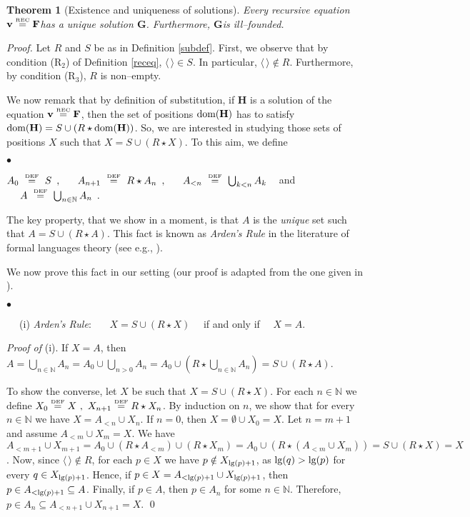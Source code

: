 \documentclass[copyright,creativecommons]{eptcs}
\def\eg{e.g., }
\newcommand{\vv}{\langle}
\newcommand{\ww}{\rangle}
\newcommand{\NN}{\mathbb{N}}
\newcommand{\eqdef}{\stackrel{\text{\tiny \textnormal{DEF}}}{=}}
\newcommand{\eqrec}{\stackrel{\text{\tiny \textnormal{REC}}}{=}}
\newcommand{\roo}{\vv \, \ww}
\newcommand{\bF}{\mathbf{F}}
\newcommand{\bG}{\mathbf{G}}
\newcommand{\bH}{\mathbf{H}}
\newcommand{\bbv}{\mathbf{v}}
\newcommand{\len}{\textnormal{lg}}
\newcommand{\dom}{\ensuremath{\textnormal{dom}}}
\newtheorem{theorem}{Theorem}[section]   \newtheorem{lemma}[theorem]{Lemma}
\theoremstyle{definition}
\newcommand{\squishlist}{
 \begin{list}{$\bullet$}
  { \setlength{\itemsep}{0pt}
     \setlength{\parsep}{3pt}
     \setlength{\topsep}{3pt}
     \setlength{\partopsep}{0pt}
     \setlength{\leftmargin}{1em}
     \setlength{\labelwidth}{1.5em}
     \setlength{\labelsep}{0.5em} } }
\newcommand{\squishend}{
  \end{list}  }
\begin{document}
\begin{theorem}[Existence and uniqueness of solutions] \label{recthem}
Every recursive equation  \/$\bbv \eqrec \bF$\@  has
a unique solution \/$\bG$\@. Furthermore,
\/$\bG$\@ is ill--founded.  \end{theorem}
\begin{proof}
Let $R$ and $S$ be as in Definition \ref{subdef}.
First, we observe that by  condition   (R$_2$)  of Definition \ref{receq}, $\roo \in S$.
In particular, $\roo \notin R$. Furthermore, by condition (R$_3$), $R$ is non--empty.


We now remark that by definition of substitution, if  $\bH$
is a solution
of the equation $\bbv \eqrec \bF$,
then the set of positions $\dom(\bH)$ has to satisfy $\dom(\bH) = S \cup (R \star \dom(\bH))$.
So, we are interested in studying   those sets of positions
$X$
such that  $ X= S \cup (R \star X)$.
To this aim, we define



\squishlist
\item[] {\centering
$ A_0 \ \eqdef \ S \enspace, \ \ \quad A_{n+1} \ \eqdef \  R \star A_n\enspace, \ \ \quad A_{< n} \ \eqdef \ \bigcup_{k < n}A_k  \enspace \  $ and $ \ \quad A \ \eqdef \  \bigcup_{n \in \NN} A_n \enspace.$ \par}
 \squishend


\noindent The key  property, that we show in  a moment, is that $A$ is the \emph{unique} set
 such that $ A= S \cup (R \star A)$.
This fact is known as \emph{Arden's Rule}
in the literature of formal languages
theory (see \eg \cite{manna}).

  We now  prove this fact in our setting (our proof is adapted from the one given in \cite{manna}).



\squishlist
\item[$\phantom{ab}$ (i)] \emph{Arden's Rule}: \ \ \  $ X= S \cup (R \star X)$ \ \  if and only if \ \
$X= A$.
 \squishend
 \noindent\emph{Proof of} (i).
 If  $X = A$, then   $A =  \bigcup_{n \in \NN} A_n = A_0 \cup \bigcup_{n >0}A_n = A_0 \cup (R \star \bigcup_{n \in \NN}A_n) =  S \cup (R \star A)$.


 To show the converse, let $X$ be such that $ X= S \cup (R \star X)$.
 For each $n \in \NN$  we define
$ X_0 \eqdef X \ , \ X_{n+1} \eqdef R \star X_n$.
By induction on $n$, we show  that for every  $n \in \NN$ we have
$X = A_{< n} \cup X_n$.
If $n=0$, then $  X = \emptyset \cup X_0 = X$.
Let  $n = m+1$ and assume $A_{< m} \cup  X_{m} =X$.
We have  $ A_{< m+1}   \cup X_{m+1} =
 A_0 \cup  (R \star  A_{< m})  \cup (R \star X_{m})
 = A_0 \cup (R \star (A_{< m} \cup  X_{m})) = S \cup (R \star X) = X
$.
Now,
since $ \roo \notin R$,  for  each $p \in X$   we have $p \notin X_{\len(p)+1}$, as  $\len(q) > \len(p)$
for every
$ q \in X_{\len(p)+1}$.
Hence, if $p \in  X =  A_{< \len(p)+1} \cup X_{\len(p)+1}$,
then   $p \in A_{< \len(p)+1} \subseteq A$.
Finally,
if $p \in A$, then $p \in  A_{n}$ for some $n \in\NN$. Therefore, $p \in A_n \subseteq
 A_{< n+1} \cup X_{n+1} = X$.
\qed




\end{proof}
\end{document}
